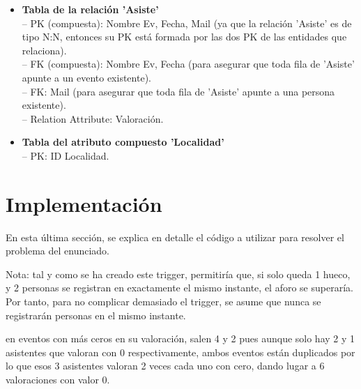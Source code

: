 \documentclass[12pt]{article}
\begin{document}
\begin{itemize}
        \item \textbf{Tabla de la relación 'Asiste'} \\
            -- PK (compuesta): Nombre Ev, Fecha, Mail (ya que la relación 'Asiste' es de tipo N:N, entonces su PK está formada por las dos PK de las 
            entidades que relaciona). \\
            -- FK (compuesta): Nombre Ev, Fecha (para asegurar que toda fila de 'Asiste' apunte a un evento existente). \\
            -- FK: Mail (para asegurar que toda fila de 'Asiste' apunte a una persona existente). \\
            -- Relation Attribute: Valoración.
            
        \item \textbf{Tabla del atributo compuesto 'Localidad'} \\
            -- PK: ID Localidad.

    \end{itemize}

    \newpage
    \section{Implementación}
    En esta última sección, se explica en detalle el código a utilizar para resolver el problema del enunciado.










    Nota: tal y como se ha creado este trigger, permitiría que, si solo queda 1 hueco, y 2 personas se registran en exactamente el mismo instante, el aforo 
    se superaría. Por tanto, para no complicar demasiado el trigger, se asume que nunca se registrarán personas en el mismo instante. 



en eventos con más ceros en su valoración, salen 4 y 2 pues aunque solo hay 2 y 1 asistentes que valoran con 0 respectivamente, ambos eventos están duplicados 
por lo que esos 3 asistentes valoran 2 veces cada uno con cero, dando lugar a 6 valoraciones con valor 0.
\end{document}
